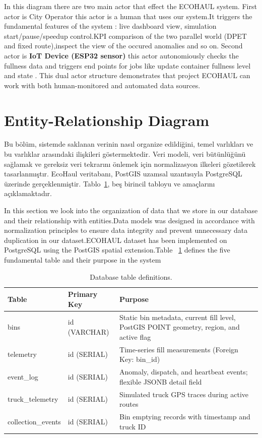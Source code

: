 \documentclass[12pt,a4paper]{report}
\begin{document}
\indent In this diagram there are two main actor that effect the ECOHAUL system. First actor is City Operator this actor is a human that uses our system.It triggers the fundamental features of the system : live dashboard view, simulation start/pause/speedup control.KPI comparison of the two parallel world (DPET and fixed route),inspect the view of the occured anomalies and so on. Second actor is \textbf{IoT Device (ESP32 sensor)} this actor autonomiously checks the fullness data  and triggers end points for jobs like update container fullness level and state . This dual actor structure demonstrates that project ECOHAUL can work with both human-monitored and automated data sources.

\section{Entity-Relationship Diagram}

\indent Bu bölüm, sistemde saklanan verinin nasıl organize edildiğini, temel varlıkları ve bu varlıklar arasındaki ilişkileri göstermektedir. Veri modeli, veri bütünlüğünü sağlamak ve gereksiz veri tekrarını önlemek için normalizasyon ilkeleri gözetilerek tasarlanmıştır. EcoHaul veritabanı, PostGIS uzamsal uzantısıyla PostgreSQL üzerinde gerçeklenmiştir. Tablo~\ref{tab:db_tables}, beş birincil tabloyu ve amaçlarını açıklamaktadır.

\indent In this section we look into the organization of data that we store in our database and their relationship with entities.Data models  was designed in accordance with normalization principles to ensure data integrity and prevent unnecessary data duplication in our dataset.ECOHAUL dataset  has been implemented on PostgreSQL using the PostGIS spatial extension.Table ~\ref{tab:db_tables} defines the five fundamental table and their purpose in the system

\begin{table}[H]
\centering
\caption{Database table definitions.}
\label{tab:db_tables}
\begin{tabular}{llp{6.8cm}}
\toprule
\textbf{Table} & \textbf{Primary Key} & \textbf{Purpose} \\
\midrule
bins              & id (VARCHAR)  & Static bin metadata, current fill level, PostGIS POINT geometry, region, and active flag \\
telemetry         & id (SERIAL)   & Time-series fill measurements (Foreign Key: bin\_id) \\
event\_log        & id (SERIAL)   & Anomaly, dispatch, and heartbeat events; flexible JSONB detail field \\
truck\_telemetry  & id (SERIAL)   & Simulated truck GPS traces during active routes \\
collection\_events & id (SERIAL)  & Bin emptying records with timestamp and truck ID \\
\bottomrule
\end{tabular}
\end{table}
\end{document}
